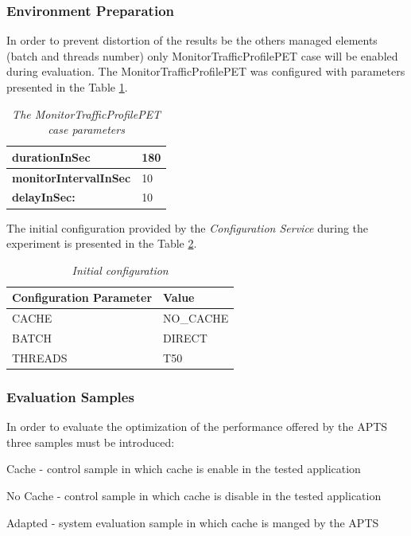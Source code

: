 \documentclass[10pt,a4paper]{article}
\let\tempone\itemize
\let\temptwo\enditemize
\renewenvironment{itemize}{\tempone\addtolength{\itemsep}{-0.4\baselineskip}}{\temptwo}
\begin{document}
\subsubsection{Environment Preparation} 

In order to prevent distortion of the results be the others managed elements (batch and threads number) only MonitorTrafficProfilePET case will be enabled during evaluation. The MonitorTrafficProfilePET was configured with parameters presented in the Table \ref{evaluationtestconf}.

\begin{table}[!htb]
\def\arraystretch{1.5}
\caption{\textit{The MonitorTrafficProfilePET case parameters}} \label{evaluationtestconf}
\begin{tabularx}{\textwidth}{X|X}

\textbf{durationInSec} & 180 \\ \hline
\textbf{monitorIntervalInSec} & 10 \\ \hline
\textbf{delayInSec:} & 10\\
\end{tabularx}
\end{table}

The initial configuration provided by the \textit{Configuration Service} during the experiment is presented in the Table \ref{cacheinitconf}.
\begin{table}[!htb]
\caption{\textit{Initial configuration}} \label{cacheinitconf}
\begin{tabularx}{\textwidth}{X|X}
\textbf{Configuration Parameter} & \textbf{Value} \\ \hline
CACHE & NO\_CACHE \\ \hline
BATCH & DIRECT\\ \hline
THREADS & T50\\
\end{tabularx}
\end{table}


\subsubsection{Evaluation Samples} \label{evaluationsamplescache}

In order to evaluate the optimization of the performance offered by the APTS three  samples must be introduced: 
\begin{itemize}
\item Cache - control sample in which cache is enable in the tested application
\item No Cache - control sample in which cache is disable in the tested application
\item Adapted - system evaluation sample in which cache is manged by the APTS
\end{itemize}
\end{document}
